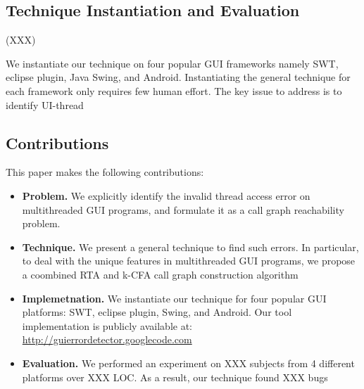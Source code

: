 \subsection{Technique Instantiation and Evaluation}

(XXX)

We instantiate our technique on four popular GUI frameworks namely SWT,
eclipse plugin, Java Swing, and Android. Instantiating the general technique
for each framework only requires few human effort. The key issue to address
is to identify UI-thread



\subsection{Contributions}

This paper makes the following contributions:

\begin{itemize}
\item \textbf{Problem.} We explicitly identify the invalid thread
access error on multithreaded GUI programs, and formulate it
as a call graph reachability problem.

\item \textbf{Technique.} We present a general technique to find
such errors. In particular, to deal with the unique features in
multithreaded GUI programs, we propose a coombined RTA and k-CFA
call graph construction algorithm

\item \textbf{Implemetnation.} We instantiate our technique for four
popular GUI platforms: SWT, eclipse plugin, Swing, and Android. Our
tool implementation is publicly available at:
\url{http://guierrordetector.googlecode.com}

\item \textbf{Evaluation.} We performed an experiment on XXX subjects
from 4 different platforms over XXX LOC. As a result, our technique
found XXX bugs 

\end{itemize}

